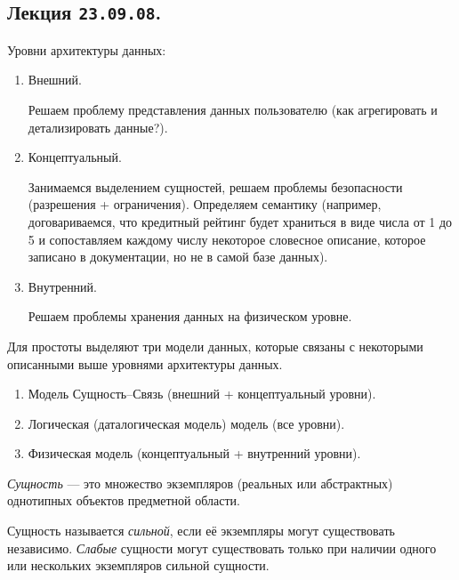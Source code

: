 \subsection{%
  Лекция \texttt{23.09.08}.%
}

Уровни архитектуры данных:
\begin{enumerate}
\item
  Внешний.

  Решаем проблему представления данных пользователю (как агрегировать и
  детализировать данные?).

\item
  Концептуальный.

  Занимаемся выделением сущностей, решаем проблемы безопасности (разрешения +
  ограничения). Определяем семантику (например, договариваемся, что кредитный
  рейтинг будет храниться в виде числа от 1 до 5 и сопоставляем каждому
  числу некоторое словесное описание, которое записано в документации, но не в
  самой базе данных).

\item
  Внутренний.

  Решаем проблемы хранения данных на физическом уровне.
\end{enumerate}

Для простоты выделяют три модели данных, которые связаны с некоторыми описанными
выше уровнями архитектуры данных.

\begin{enumerate}
\item
  Модель Сущность--Связь (внешний + концептуальный уровни).

\item
  Логическая (даталогическая модель) модель (все уровни).

\item
  Физическая модель (концептуальный + внутренний уровни).
\end{enumerate}


\begin{definition}
  \textit{Сущность} --- это множество экземпляров (реальных или абстрактных) 
  однотипных объектов предметной области.
\end{definition}

\begin{definition}
  Сущность называется \textit{сильной}, если её экземпляры могут существовать независимо.
  \textit{Слабые} сущности могут существовать только при наличии одного или нескольких
  экземпляров сильной сущности.
\end{definition}

